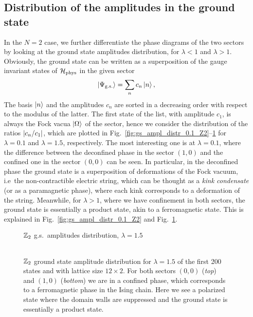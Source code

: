 \subsection{Distribution of the amplitudes in the ground state}
\label{sub:amplitudes_distribution}

In the $N=2$ case, we further differentiate the phase diagrams of the two sectors by looking at the ground state amplitudes distribution, for $\lambda<1$ and $\lambda>1$.
Obviously, the ground state can be written as a superposition of the gauge invariant states of $\mathcal{H}_{\text{phys}}$ in the given sector
\begin{equation}
    \ket{\Psi_{\text{g.s.} }}= \sum_n c_n \ket{n},
    \label{eq:gs_amplitudes}
\end{equation}
The basis $\ket{n}$ and the amplitudes $c_n$ are sorted in a decreasing order with respect to the modulus of the latter.
The first state of the list, with amplitude $c_1$, is always the Fock vacua $\ket{\Omega}$ of the sector, hence we consider the distribution of the ratios $\abs{c_n / c_1}$, which are plotted in Fig.~\ref{fig:gs_ampl_distr_0.1_Z2}--\ref{fig:gs_ampl_distr_1.5_Z2} for $\lambda=0.1$ and $\lambda=1.5$, respectively.
The most interesting one is at $\lambda = 0.1$, where the difference between the deconfined phase in the sector $(1,0)$ and the confined one in the sector $(0,0)$ can be seen.
In particular, in the deconfined phase the ground state is a superposition of deformations of the Fock vacuum, i.e~the non-contractible electric string, which can be thought as a \emph{kink condensate} \cite{fradkin1978order} (or as a paramagnetic phase), where each kink corresponds to a deformation of the string.
Meanwhile, for $\lambda > 1$, where we have confinement in both sectors, the ground state is essentially a product state, akin to a ferromagnetic state.
This is explained in Fig.~\ref{fig:gs_ampl_distr_0.1_Z2} and Fig.~\ref{fig:gs_ampl_distr_1.5_Z2}.


\begin{figure}[h]
    \centering
    \hspace{3em}$\Z_2$ g.s.~amplitudes distribution, $\lambda=1.5$\\[5pt]
    \\[-2pt]\hspace{0.4pt}
    
    \caption[$\Z_2$ ground state amplitude distribution for $\lambda = 1.5$]{
    $\Z_2$ ground state amplitude distribution for $\lambda=1.5$ of the first 200 states and with lattice size $12 \times 2$.
    For both sectors $(0,0)$ (\emph{top}) and $(1,0)$ (\emph{bottom}) we are in a confined phase, which corresponds to a ferromagnetic phase in the Ising chain.
    Here we see a polarized state where the domain walls are suppressed and the ground state is essentially a product state.
    }
    \label{fig:gs_ampl_distr_1.5_Z2}
\end{figure}


